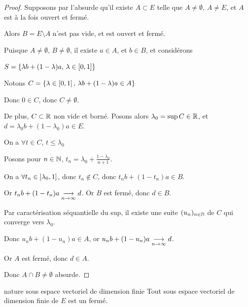 \begin{proof}
    Supposons par l'absurde qu'il existe $A \subset E$ telle que $A \neq \emptyset$, $A \neq E$, et $A$ est à la fois ouvert et fermé.

    Alors $B = E \setminus A$ n'est pas vide, et est ouvert et fermé. 

    Puisque $A \neq \emptyset, \, B \neq \emptyset$, il existe $a \in A$, et $b \in B$, 
    et considérons 
    
    $S = \left\{\lambda b + (1 - \lambda )a, \, \lambda \in \left[0, 1\right]\right\}$

    Notons $C = \left\{\lambda \in \left[0, 1\right], \, \lambda b + (1 - \lambda )a \in A\right\}$

    Donc $0 \in C$, donc $C \neq \emptyset$.

    De plus, $C \subset \mathbb{R}$ non vide et borné. Posons alors $\lambda_0 = \sup C \in \mathbb{R}$, et 
    $d = \lambda_0 b + (1 - \lambda_0)a \in E$.

    On a $\forall t \in C, \, t \leqslant \lambda_0$

    Posons pour $\displaystyle n \in \mathbb{N}$, $\displaystyle t_n = \lambda_0 + \frac{1 - \lambda_0}{n + 1}$. 

    On a $\forall t_n \in \left]\lambda_0, 1\right]$, donc $t_n \not \in C$, donc $t_n b + (1 - t_n)a \in B$.

    Or $t_n b + (1 - t_n)a \underset{n \to \infty}{\longrightarrow} d$. Or $B$ est fermé, donc $d \in B$.

    Par caractérisation séquantielle du sup, il existe une suite $(u_n)_{n \in \mathbb{N}}$ de $C$ qui converge 
    vers $\lambda_0$.

    Donc $u_n b + (1 - u_n)a \in A$, or $u_n b + (1 - u_n)a \underset{n \to \infty}{\longrightarrow} d$.

    Or $A$ est fermé, donc $d \in A$.

    Donc $A \cap B \neq \emptyset$ absurde.
\end{proof}

\begin{theoreme}{nature sous espace vectoriel de dimension finie}{}
    Tout sous espace vectoriel de dimension finie de $E$ est un fermé. 
\end{theoreme}


